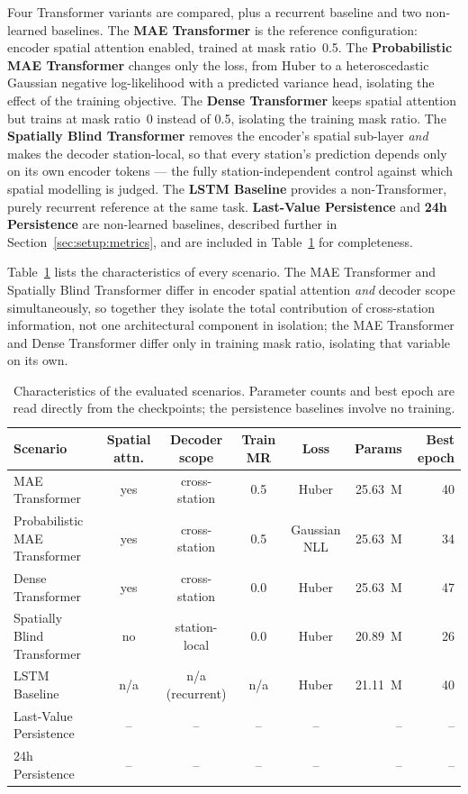 Four Transformer variants are compared, plus a recurrent baseline and two
non-learned baselines. The \textbf{MAE Transformer} is the reference
configuration: encoder spatial attention enabled, trained at mask ratio~0.5.
The \textbf{Probabilistic MAE Transformer} changes only the loss, from Huber
to a heteroscedastic Gaussian negative log-likelihood with a predicted
variance head, isolating the effect of the training objective. The
\textbf{Dense Transformer} keeps spatial attention but trains at mask
ratio~0 instead of 0.5, isolating the training mask ratio. The
\textbf{Spatially Blind Transformer} removes the encoder's spatial sub-layer
\emph{and} makes the decoder station-local, so that every station's
prediction depends only on its own encoder tokens --- the fully
station-independent control against which spatial modelling is judged. The
\textbf{LSTM Baseline} provides a non-Transformer, purely recurrent
reference at the same task. \textbf{Last-Value Persistence} and \textbf{24h
Persistence} are non-learned baselines, described further in
Section~\ref{sec:setup:metrics}, and are included in Table~\ref{tab:scenarios}
for completeness.

Table~\ref{tab:scenarios} lists the characteristics of every scenario. The
MAE Transformer and Spatially Blind Transformer differ in encoder spatial
attention \emph{and} decoder scope simultaneously, so together they isolate
the total contribution of cross-station information, not one architectural
component in isolation; the MAE Transformer and Dense Transformer differ
only in training mask ratio, isolating that variable on its own.

\begin{table}[htbp]
\centering
\caption{Characteristics of the evaluated scenarios. Parameter counts and
best epoch are read directly from the checkpoints; the persistence baselines
involve no training.}
\label{tab:scenarios}
\begin{tabular}{lccccrr}
\toprule
Scenario & Spatial attn. & Decoder scope & Train MR & Loss & Params & Best epoch \\
\midrule
MAE Transformer               & yes & cross-station    & 0.5 & Huber        & 25.63~M & 40 \\
Probabilistic MAE Transformer & yes & cross-station    & 0.5 & Gaussian NLL & 25.63~M & 34 \\
Dense Transformer              & yes & cross-station    & 0.0 & Huber        & 25.63~M & 47 \\
Spatially Blind Transformer    & no  & station-local    & 0.0 & Huber        & 20.89~M & 26 \\
LSTM Baseline                  & n/a & n/a (recurrent)  & n/a & Huber        & 21.11~M & 40 \\
Last-Value Persistence         & --  & --               & --  & --           & --      & -- \\
24h Persistence                 & --  & --               & --  & --           & --      & -- \\
\bottomrule
\end{tabular}
\end{table}


